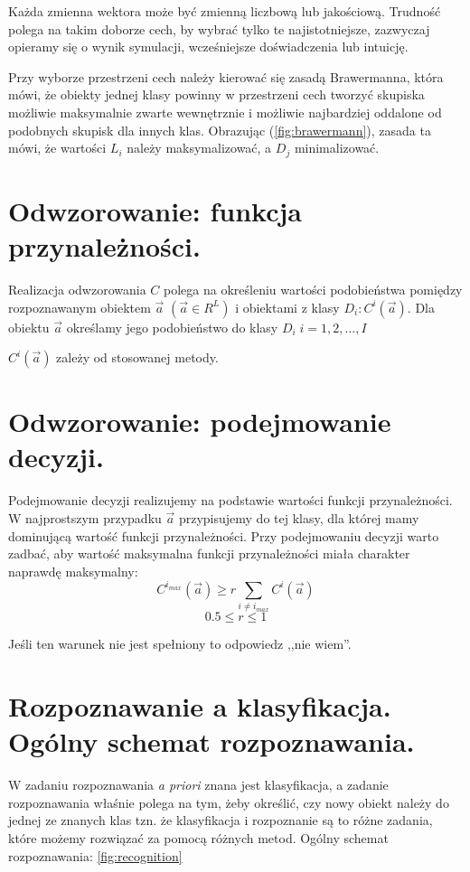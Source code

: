 \documentclass[a4paper,10pt]{article}
\begin{document}
Każda zmienna wektora może być zmienną liczbową lub jakościową. Trudność polega na takim doborze cech, by wybrać tylko te najistotniejsze, zazwyczaj opieramy się o wynik symulacji, wcześniejsze doświadczenia lub intuicję.

Przy wyborze przestrzeni cech należy kierować się zasadą Brawermanna, która mówi, że obiekty jednej klasy powinny w przestrzeni cech tworzyć skupiska możliwie maksymalnie zwarte wewnętrznie i możliwie najbardziej oddalone od podobnych skupisk dla innych klas. Obrazując (\ref{fig:brawermann}), zasada ta mówi, że wartości $L_i$ należy maksymalizować, a $D_j$ minimalizować.

\section{Odwzorowanie: funkcja przynależności.}
Realizacja odwzorowania $C$ polega na określeniu wartości podobieństwa pomiędzy rozpoznawanym obiektem $\overrightarrow{a}$ $(\overrightarrow{a} \in R^L)$ i obiektami z klasy $D_i: C^i(\overrightarrow{a})$. Dla obiektu $\overrightarrow{a}$ określamy jego podobieństwo do klasy $D_i\; i = 1, 2, \ldots, I$

$C^i(\overrightarrow{a})$ zależy od stosowanej metody.

\section{Odwzorowanie: podejmowanie decyzji.}
Podejmowanie decyzji realizujemy na podstawie wartości funkcji przynależności. W najprostszym przypadku $\overrightarrow{a}$ przypisujemy do tej klasy, dla której mamy dominującą wartość funkcji przynależności. Przy podejmowaniu decyzji warto zadbać, aby wartość maksymalna funkcji przynależności miała charakter naprawdę maksymalny:
\begin{equation}
C^{i_{max}}(\overrightarrow{a}) \geq r \sum_{i \neq i_{max}} C^i(\overrightarrow{a})
\end{equation}
\begin{equation}
 0.5 \leq r \leq 1
\end{equation}

Jeśli ten warunek nie jest spełniony to odpowiedz ,,nie wiem''.

\section{Rozpoznawanie a klasyfikacja. Ogólny schemat rozpoznawania.}
W zadaniu rozpoznawania \textit{a priori} znana jest klasyfikacja, a zadanie rozpoznawania właśnie polega na tym, żeby określić, czy nowy obiekt należy do jednej ze znanych klas tzn. że klasyfikacja i rozpoznanie są to różne zadania, które możemy rozwiązać za pomocą różnych metod.
Ogólny schemat rozpoznawania: \ref{fig:recognition}
\end{document}
